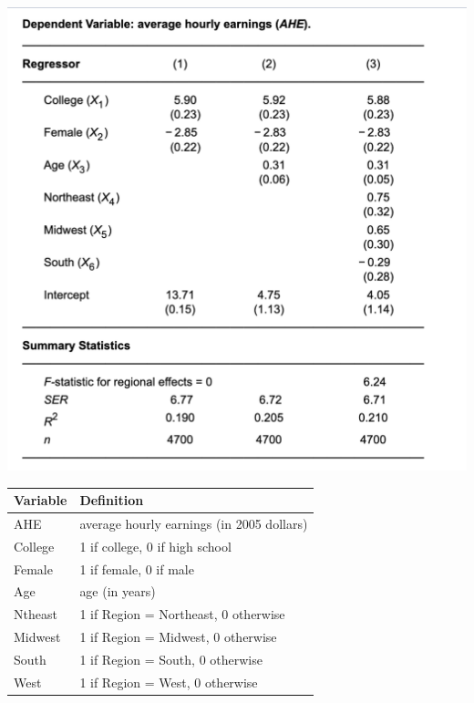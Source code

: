 \documentclass[
]{article}
\begin{document}
\centering\includegraphics[scale=0.5]{materials/sw7-3.png}

\begin{longtable}[]{@{}ll@{}}
\toprule
Variable & Definition\tabularnewline
\midrule
\endhead
AHE & average hourly earnings (in 2005 dollars)\tabularnewline
College & 1 if college, 0 if high school\tabularnewline
Female & 1 if female, 0 if male\tabularnewline
Age & age (in years)\tabularnewline
Ntheast & 1 if Region = Northeast, 0 otherwise\tabularnewline
Midwest & 1 if Region = Midwest, 0 otherwise\tabularnewline
South & 1 if Region = South, 0 otherwise\tabularnewline
West & 1 if Region = West, 0 otherwise\tabularnewline
\bottomrule
\end{longtable}
\end{document}
